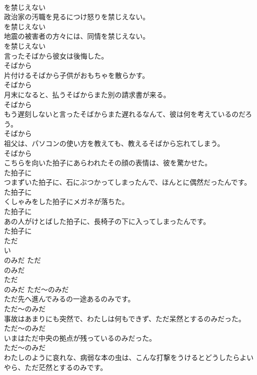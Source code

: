 \documentclass[8pt]{extreport}
\begin{document}
\begin{CJK}{UTF8}{min}
\\	を禁じえない	
\\	政治家の汚職を見るにつけ怒りを禁じえない。	
\\	を禁じえない	
\\	地震の被害者の方々には、同情を禁じえない。	
\\	を禁じえない	
\\	言ったそばから彼女は後悔した。	
\\	そばから	
\\	片付けるそばから子供がおもちゃを散らかす。	
\\	そばから	
\\	月末になると、払うそばからまた別の請求書が来る。	
\\	そばから	
\\	もう遅刻しないと言ったそばからまた遅れるなんて、彼は何を考えているのだろう。	
\\	そばから	
\\	祖父は、パソコンの使い方を教えても、教えるそばから忘れてしまう。	
\\	そばから	
\\	こちらを向いた拍子にあらわれたその顔の表情は、彼を驚かせた。	
\\	た拍子に	
\\	つまずいた拍子に、石にぶつかってしまったんで、ほんとに偶然だったんです。	
\\	た拍子に	
\\	くしゃみをした拍子にメガネが落ちた。	
\\	た拍子に	
\\	あの人がけとばした拍子に、長椅子の下に入ってしまったんです。	
\\	た拍子に	
\\	ただ 
\\	い
\\	のみだ	ただ 
\\	のみだ	
\\	ただ 
\\	のみだ	ただ～のみだ	
\\	ただ先へ進んでみるの一途あるのみです。	
\\	ただ～のみだ	
\\	事故はあまりにも突然で、わたしは何もできず、ただ呆然とするのみだった。	
\\	ただ～のみだ	
\\	いまはただ中央の拠点が残っているのみだった。	
\\	ただ～のみだ	
\\	わたしのように哀れな、病弱な本の虫は、こんな打撃をうけるとどうしたらよいやら、ただ茫然とするのみです。	

\end{CJK}
\end{document}
